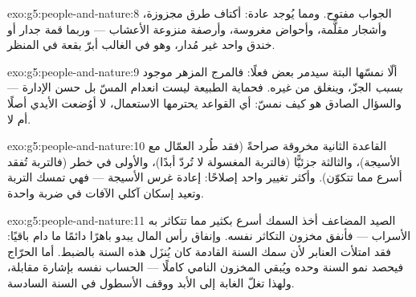 \begin{solution}{exo:g5:people-and-nature:8}
الجواب مفتوح. ومما يُوجد عادة: أكتاف طرق مجزوزة، وأشجار مقلَّمة،
وأحواض مغروسة، وأرصفة منزوعة الأعشاب --- وربما قمة جدار أو خندق
واحد غير مُدار، وهو في الغالب أبرّ بقعة في المنظر.
\end{solution}

\begin{solution}{exo:g5:people-and-nature:9}
ألّا نمسّها البتة سيدمر بعض  فعلًا: فالمرج المزهر موجود
\emph{بسبب} الجزّ، وينغلق من غيره. فحماية الطبيعة ليست انعدام
المسّ بل حسن الإدارة --- والسؤال الصادق هو كيف نمسّ: أي القواعد
يحترمها الاستعمال، لا أوُضعت الأيدي أصلًا أم لا.
\end{solution}

\begin{solution}{exo:g5:people-and-nature:10}
القاعدة الثانية مخروقة صراحةً (فقد طُرد العمّال مع الأسيجة)،
والثالثة جزئيًّا (فالتربة المغسولة لا تُردّ أبدًا)، والأولى في خطر
(فالتربة تُفقد أسرع مما تتكوّن). وأكثر تغيير واحد إصلاحًا: إعادة
غرس الأسيجة --- فهي تمسك التربة وتعيد إسكان آكلي الآفات في ضربة
واحدة.
\end{solution}

\begin{solution}{exo:g5:people-and-nature:11}
الصيد المضاعف أخذ السمك أسرع بكثير مما تتكاثر به الأسراب ---
فأنفق مخزون التكاثر نفسه. وإنفاق رأس المال يبدو باهرًا دائمًا ما
دام باقيًا: فقد امتلأت العنابر لأن سمك السنة القادمة كان يُنزَل
هذه السنة بالضبط. أما الحرّاج فيحصد نمو السنة وحده ويُبقي المخزون
النامي كاملًا --- الحساب نفسه بإشارة مقابلة، ولهذا تغلّ الغابة إلى
الأبد ووقف الأسطول في السنة السادسة.
\end{solution}
